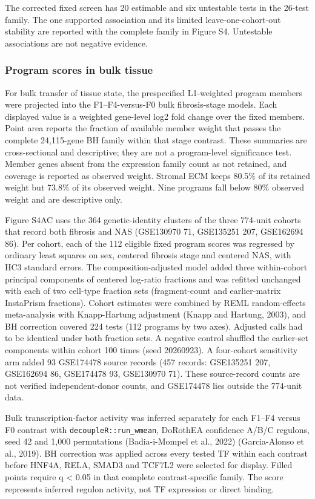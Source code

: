 The corrected fixed screen has 20 estimable and six untestable tests in the 26-test family. The one supported association and its limited leave-one-cohort-out stability are reported with the complete family in Figure S4. Untestable associations are not negative evidence.

\subsubsection{Program scores in bulk tissue}\label{program-scores-in-bulk-tissue}

For bulk transfer of tissue state, the prespecified L1-weighted program members were projected into the F1--F4-versus-F0 bulk fibrosis-stage models. Each displayed value is a weighted gene-level log2 fold change over the fixed members. Point area reports the fraction of available member weight that passes the complete 24,115-gene BH family within that stage contrast. These summaries are cross-sectional and descriptive; they are not a program-level significance test. Member genes absent from the expression family count as not retained, and coverage is reported as observed weight. Stromal ECM keeps 80.5\% of its retained weight but 73.8\% of its observed weight. Nine programs fall below 80\% observed weight and are descriptive only.

Figure S4AC uses the 364 genetic-identity clusters of the three 774-unit cohorts that record both fibrosis and NAS (GSE130970 71, GSE135251 207, GSE162694 86). Per cohort, each of the 112 eligible fixed program scores was regressed by ordinary least squares on sex, centered fibrosis stage and centered NAS, with HC3 standard errors. The composition-adjusted model added three within-cohort principal components of centered log-ratio fractions and was refitted unchanged with each of two cell-type fraction sets (fragment-count and earlier-matrix InstaPrism fractions). Cohort estimates were combined by REML random-effects meta-analysis with Knapp-Hartung adjustment (Knapp and Hartung, 2003), and BH correction covered 224 tests (112 programs by two axes). Adjusted calls had to be identical under both fraction sets. A negative control shuffled the earlier-set components within cohort 100 times (seed 20260923). A four-cohort sensitivity arm added 93 GSE174478 source records (457 records: GSE135251 207, GSE162694 86, GSE174478 93, GSE130970 71). These source-record counts are not verified independent-donor counts, and GSE174478 lies outside the 774-unit data.

Bulk transcription-factor activity was inferred separately for each F1--F4 versus F0 contrast with \texttt{decoupleR::run\_\allowbreak{}wmean}, DoRothEA confidence A/B/C regulons, seed 42 and 1,000 permutations (Badia-i-Mompel et al., 2022) (Garcia-Alonso et al., 2019). BH correction was applied across every tested TF within each contrast before HNF4A, RELA, SMAD3 and TCF7L2 were selected for display. Filled points require q \textless{} 0.05 in that complete contrast-specific family. The score represents inferred regulon activity, not TF expression or direct binding.

